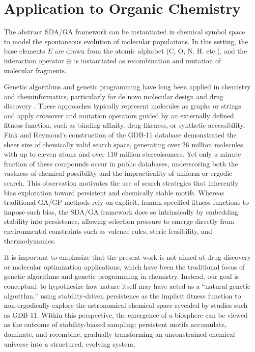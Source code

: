 \documentclass[life,article,submit,pdftex,moreauthors]{Definitions/mdpi}
\begin{document}
\section{Application to Organic Chemistry}

The abstract SDA/GA framework can be instantiated in chemical symbol space to model 
the spontaneous evolution of molecular populations. In this setting, the base elements 
$E$ are drawn from the atomic alphabet (C, O, N, H, etc.), and the interaction operator 
$\oplus$ is instantiated as recombination and mutation of molecular fragments. 

Genetic algorithms and genetic programming have long been applied in chemistry and 
cheminformatics, particularly for de novo molecular design and drug discovery 
\cite{brown2004ga,lewis1998gp,jensen2019ga,yoshikawa2018ga}. These approaches typically 
represent molecules as graphs or strings and apply crossover and mutation operators 
guided by an externally defined fitness function, such as binding affinity, 
drug-likeness, or synthetic accessibility. Fink and Reymond’s construction of the 
GDB-11 database \cite{fink2007gdb11} demonstrated the sheer size of chemically valid 
search space, generating over 26 million molecules with up to eleven atoms and over 
110 million stereoisomers. Yet only a minute fraction of these compounds occur in 
public databases, underscoring both the vastness of chemical possibility and the 
impracticality of uniform or ergodic search. This observation motivates the use of 
search strategies that inherently bias exploration toward persistent and chemically 
stable motifs. Whereas traditional GA/GP methods rely on explicit, human-specified 
fitness functions to impose such bias, the SDA/GA framework does so intrinsically by 
embedding stability into persistence, allowing selection pressure to emerge directly 
from environmental constraints such as valence rules, steric feasibility, and 
thermodynamics.

It is important to emphasize that the present work is not aimed at drug discovery 
or molecular optimization applications, which have been the traditional focus of 
genetic algorithms and genetic programming in chemistry. Instead, our goal is 
conceptual: to hypothesize how nature itself may have acted as a “natural genetic 
algorithm,” using stability-driven persistence as the implicit fitness function to 
non-ergodically explore the astronomical chemical space revealed by studies such 
as GDB-11. Within this perspective, the emergence of a biosphere can be viewed as 
the outcome of stability-biased sampling: persistent motifs accumulate, dominate, 
and recombine, gradually transforming an unconstrained chemical universe into a 
structured, evolving system.
\end{document}
